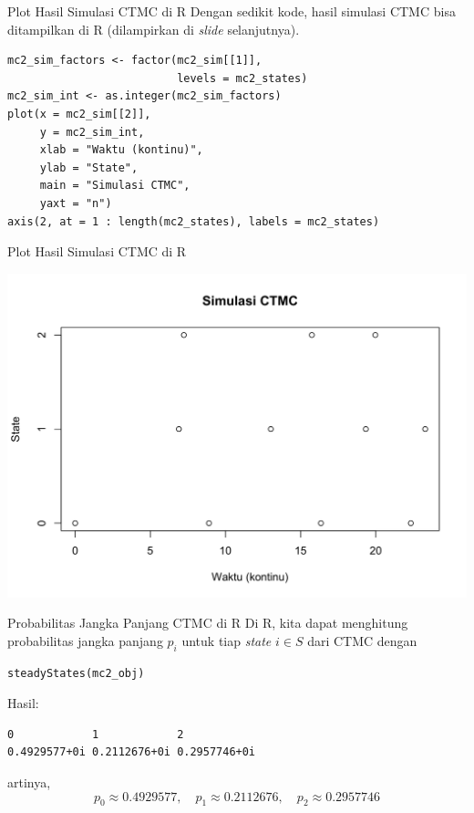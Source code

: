 \documentclass{beamer}
\begin{document}
\begin{frame}[fragile]{Plot Hasil Simulasi CTMC di R}
    Dengan sedikit kode, hasil simulasi CTMC bisa ditampilkan di R (dilampirkan di \textit{slide} selanjutnya).
\begin{verbatim}
mc2_sim_factors <- factor(mc2_sim[[1]],
                          levels = mc2_states)
mc2_sim_int <- as.integer(mc2_sim_factors)
plot(x = mc2_sim[[2]],
     y = mc2_sim_int,
     xlab = "Waktu (kontinu)",
     ylab = "State",
     main = "Simulasi CTMC",
     yaxt = "n")
axis(2, at = 1 : length(mc2_states), labels = mc2_states)
\end{verbatim}
\end{frame}

\begin{frame}{Plot Hasil Simulasi CTMC di R}
    \begin{center}
        \includegraphics[scale=0.6]{gambar/contoh_ctmc_simulasi.png}
    \end{center}
\end{frame}

\begin{frame}[fragile]{Probabilitas Jangka Panjang CTMC di R}
    Di R, kita dapat menghitung probabilitas jangka panjang \(p_i\) untuk tiap \textit{state} \(i \in S\) dari CTMC dengan
\begin{verbatim}
steadyStates(mc2_obj)
\end{verbatim}
    Hasil:
\begin{verbatim}
0            1            2
0.4929577+0i 0.2112676+0i 0.2957746+0i
\end{verbatim}
    artinya,
    \[p_0 \approx 0.4929577, \quad p_1 \approx 0.2112676, \quad p_2 \approx 0.2957746\]
\end{frame}
\end{document}
